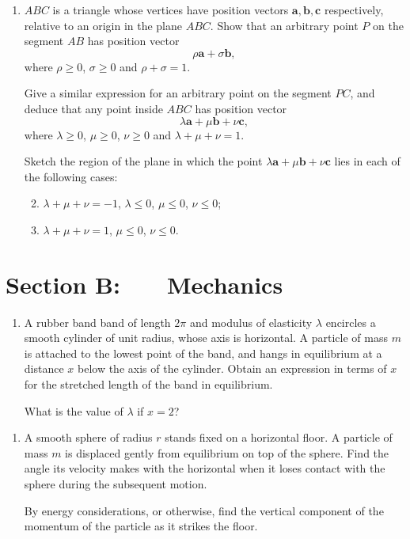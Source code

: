 \documentclass[a4, 11pt]{report}
\newlength{\qspace}
\newcounter{qnumber}
\newenvironment{question}%
 {\vspace{\qspace}
  \begin{enumerate}[\bfseries 1\quad][10]%
    \setcounter{enumi}{\value{qnumber}}%
    \item%
 }
{
  \end{enumerate}
  \filbreak
  \stepcounter{qnumber}
 }
\newenvironment{questionparts}[1][1]%
 {
  \begin{enumerate}[\bfseries (i)]%
    \setcounter{enumii}{#1}
    \addtocounter{enumii}{-1}
    \setlength{\itemsep}{5mm}
    \setlength{\parskip}{8pt}
 }
 {
  \end{enumerate}
 }
\begin{document}
		
\begin{question}
$ABC$ is a triangle whose vertices have position vectors $\mathbf{a,b,c}$
respectively, relative to an origin in the plane $ABC$. Show that
an arbitrary point $P$ on the segment $AB$ has position vector 
\[
\rho\mathbf{a}+\sigma\mathbf{b},
\]
where $\rho\geqslant0$, $\sigma\geqslant0$ and $\rho+\sigma=1$. 


Give a similar expression for an arbitrary point on the segment $PC$,
and deduce that any point inside $ABC$ has position vector 
\[
\lambda\mathbf{a}+\mu\mathbf{b}+\nu\mathbf{c},
\]
where $\lambda\geqslant0$, $\mu\geqslant0$, $\nu\geqslant0$ and
$\lambda+\mu+\nu=1$. 


Sketch the region of the plane in which the point $\lambda\mathbf{a}+\mu\mathbf{b}+\nu\mathbf{c}$
lies in each of the following cases: 
\begin{questionparts}
\item $\lambda+\mu+\nu=-1$, $\lambda\leqslant0$, $\mu\leqslant0$, $\nu\leqslant0$;
\item $\lambda+\mu+\nu=1$, $\mu\leqslant0$, $\nu\leqslant0$.
\end{questionparts}
\end{question}

\newpage
\section*{Section B: \ \ \ Mechanics}


	
\begin{question}
A rubber band band of length $2\pi$ and modulus of elasticity $\lambda$
encircles a smooth cylinder of unit radius, whose axis is horizontal.
A particle of mass $m$ is attached to the lowest point of the band,
and hangs in equilibrium at a distance $x$ below the axis of the
cylinder. Obtain an expression in terms of $x$ for the stretched
length of the band in equilibrium. 


What is the value of $\lambda$ if $x=2$? 

	\end{question}
	
\begin{question}	
A smooth sphere of radius $r$ stands fixed on a horizontal floor.
A particle of mass $m$ is displaced gently from equilibrium on top
of the sphere. Find the angle its velocity makes with the horizontal
when it loses contact with the sphere during the subsequent motion. 


By energy considerations, or otherwise, find the vertical component
of the momentum of the particle as it strikes the floor. 
\end{question}
\end{document}
